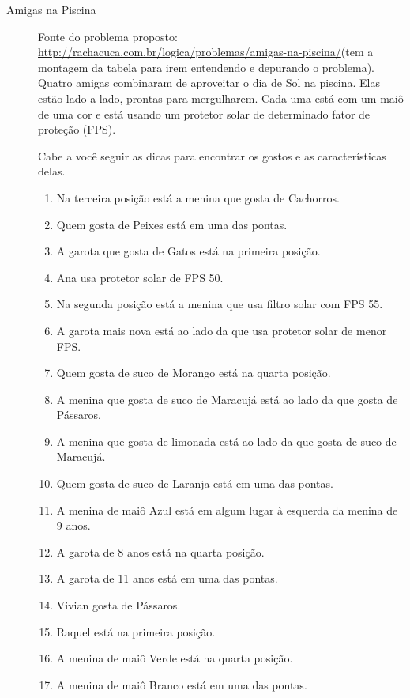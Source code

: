 \documentclass[a4paper,11pt]{article}
\begin{document}
\begin{description}

\item [Amigas na Piscina] Fonte do problema proposto:   \url{http://rachacuca.com.br/logica/problemas/amigas-na-piscina/}(tem a montagem da tabela para irem entendendo e depurando o problema).\\

Quatro amigas combinaram de aproveitar o dia de Sol na piscina. Elas estão lado a lado, prontas para mergulharem. Cada uma está com um maiô de uma cor e está usando um protetor solar de determinado fator de proteção (FPS).

Cabe a você seguir as dicas para encontrar os gostos e as características delas.

\begin{enumerate}
  \item     Na terceira posição está a menina que gosta de Cachorros.
  \item     Quem gosta de Peixes está em uma das pontas.
  \item     A garota que gosta de Gatos está na primeira posição.
  \item     Ana usa protetor solar de FPS 50.
  \item     Na segunda posição está a menina que usa filtro solar com FPS 55.
  \item     A garota mais nova está ao lado da que usa protetor solar de menor FPS.
  \item    Quem gosta de suco de Morango está na quarta posição.
  \item     A menina que gosta de suco de Maracujá está ao lado da que gosta de Pássaros.
  \item     A menina que gosta de limonada está ao lado da que gosta de suco de Maracujá.
  
  \item   Quem gosta de suco de Laranja está em uma das pontas.
  \item     A menina de maiô Azul está em algum lugar à esquerda da menina de 9 anos.
  \item     A garota de 8 anos está na quarta posição.
  \item     A garota de 11 anos está em uma das pontas.
  \item     Vivian gosta de Pássaros.
  \item     Raquel está na primeira posição.
  \item     A menina de maiô Verde está na quarta posição.
  \item     A menina de maiô Branco está em uma das pontas.
   

\end{enumerate}
\end{description}
\end{document}
